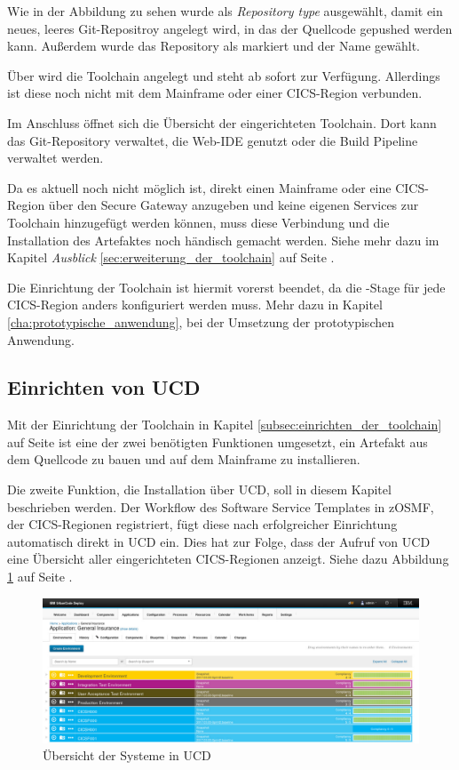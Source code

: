 Wie in der Abbildung zu sehen wurde als \textit{Repository type}  ausgewählt, damit ein neues, leeres
Git-Repositroy angelegt wird, in das der Quellcode gepushed werden kann. Außerdem wurde das Repository als 
markiert und der Name  gewählt.

Über  wird die Toolchain angelegt und steht ab sofort zur Verfügung. Allerdings ist diese noch nicht mit dem
Mainframe oder einer CICS-Region verbunden.

Im Anschluss öffnet sich die Übersicht der eingerichteten Toolchain. Dort kann das Git-Repository verwaltet, die
Web-IDE genutzt oder die Build Pipeline verwaltet werden.

Da es aktuell noch nicht möglich ist, direkt einen Mainframe oder eine CICS-Region über den Secure Gateway anzugeben und
keine eigenen Services zur Toolchain hinzugefügt werden können, muss diese Verbindung und die Installation des Artefaktes
noch händisch gemacht werden. Siehe mehr dazu im Kapitel \textit{Ausblick} \ref{sec:erweiterung_der_toolchain} auf Seite
\pageref{sec:erweiterung_der_toolchain}.

Die Einrichtung der Toolchain ist hiermit vorerst beendet, da die -Stage für jede CICS-Region anders
konfiguriert werden muss. Mehr dazu in Kapitel \ref{cha:prototypische_anwendung}, bei der Umsetzung der prototypischen
Anwendung.

\subsection{Einrichten von UCD}
Mit der Einrichtung der Toolchain in Kapitel \ref{subsec:einrichten_der_toolchain} auf Seite
\pageref{subsec:einrichten_der_toolchain} ist eine der zwei benötigten Funktionen umgesetzt, ein Artefakt aus dem Quellcode
zu bauen und auf dem Mainframe zu installieren.

Die zweite Funktion, die Installation über UCD, soll in diesem Kapitel beschrieben werden. Der Workflow des Software
Service Templates in zOSMF, der CICS-Regionen registriert, fügt diese nach erfolgreicher Einrichtung automatisch direkt
in UCD ein. Dies hat zur Folge, dass der Aufruf von UCD eine Übersicht aller eingerichteten CICS-Regionen anzeigt. Siehe
dazu Abbildung \ref{fig:ucd_overview} auf Seite \pageref{fig:ucd_overview}.

\begin{figure}[h]
  \centering
    \includegraphics[scale=0.31]{images/kapitel_3/ucd_overview.pdf}
  \caption{Übersicht der Systeme in UCD}
  \label{fig:ucd_overview}
\end{figure}

